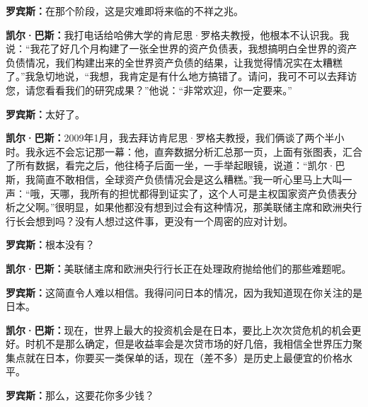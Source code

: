 \begin{BookQuote}
\textbf{罗宾斯：}在那个阶段，这是灾难即将来临的不祥之兆。
\end{BookQuote}

\begin{BookQuote}
\textbf{凯尔·巴斯：}我打电话给哈佛大学的肯尼思·罗格夫教授，他根本不认识我。我说：“我花了好几个月构建了一张全世界的资产负债表，我想搞明白全世界的资产负债情况，我们构建出来的全世界资产负债的结果，让我觉得情况实在太糟糕了。”我急切地说，“我想，我肯定是有什么地方搞错了。请问，我可不可以去拜访您，请您看看我们的研究成果？”他说：“非常欢迎，你一定要来。”
\end{BookQuote}

\begin{BookQuote}
\textbf{罗宾斯：}太好了。
\end{BookQuote}

\begin{BookQuote}
\textbf{凯尔·巴斯：}2009年1月，我去拜访肯尼思·罗格夫教授，我们俩谈了两个半小时。我永远不会忘记那一幕：他，直奔数据分析汇总那一页，上面有张图表，汇合了所有数据，看完之后，他往椅子后面一坐，一手举起眼镜，说道：“凯尔·巴斯，我简直不敢相信，全球资产负债情况会是这么糟糕。”我一听心里马上大叫一声：“哦，天哪，我所有的担忧都得到证实了，这个人可是主权国家资产负债表分析之父啊。”很明显，如果他都没有想到过会有这种情况，那美联储主席和欧洲央行行长会想到吗？没有人想过这件事，更没有一个周密的应对计划。
\end{BookQuote}

\begin{BookQuote}
\textbf{罗宾斯：}根本没有？
\end{BookQuote}

\begin{BookQuote}
\textbf{凯尔·巴斯：}美联储主席和欧洲央行行长正在处理政府抛给他们的那些难题呢。
\end{BookQuote}

\begin{BookQuote}
\textbf{罗宾斯：}这简直令人难以相信。我得问问日本的情况，因为我知道现在你关注的是日本。
\end{BookQuote}

\begin{BookQuote}
\textbf{凯尔·巴斯：}现在，世界上最大的投资机会是在日本，要比上次次贷危机的机会更好。时机不是那么确定，但是收益率会是次贷市场的好几倍，我相信全世界压力聚集点就在日本，你要买一类保单的话，现在（差不多）是历史上最便宜的价格水平。
\end{BookQuote}

\begin{BookQuote}
\textbf{罗宾斯：}那么，这要花你多少钱？
\end{BookQuote}

